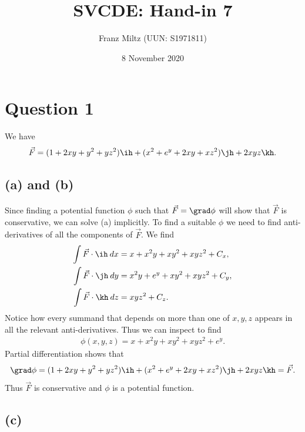 \documentclass{article}
\begin{document}
\title{SVCDE: Hand-in 7}
\author{Franz Miltz (UUN: S1971811)}
\date{8 November 2020}
\maketitle


\section*{Question 1}


We have
\begin{align*}
	\vec F = (1+2xy+y^2+yz^2)\ih + (x^2+e^y+2xy+xz^2)\jh + 2xyz\kh.
\end{align*}

\subsection*{(a) and (b)}

Since finding a potential function $\phi$ such that $\vec F = \grad\phi$
will show that $\vec F$ is conservative, we can solve (a) implicitly.
To find a suitable $\phi$ we need to find anti-derivatives of all the components
of $\vec F$. We find
\begin{align*}
	\int \vec F\cdot \ih\: dx & = x + x^2y + xy^2 + xyz^2 + C_x, \\
	\int \vec F\cdot \jh\: dy & = x^2y+e^y+xy^2+xyz^2+C_y,       \\
	\int \vec F\cdot \kh\: dz & = xyz^2 + C_z.
\end{align*}
Notice how every summand that depends on more than one of $x,y,z$ appears
in all the relevant anti-derivatives. Thus we can inspect to find
\begin{align}
	\label{eqphi}
	\phi(x,y,z) = x + x^2y + xy^2 + xyz^2 + e^y.
\end{align}
Partial differentiation shows that
\begin{align*}
	\grad \phi = (1+2xy+y^2+yz^2)\ih + (x^2+e^y+2xy+xz^2)\jh + 2xyz\kh = \vec F.
\end{align*}
Thus $\vec F$ is conservative and $\phi$ is a potential function.

\subsection*{(c)}
\end{document}

